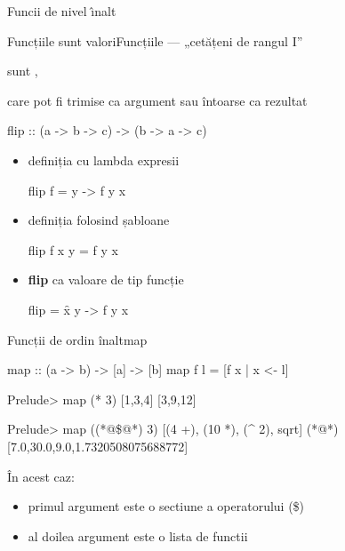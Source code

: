 \documentclass[xcolor=pdftex,romanian,colorlinks]{beamer}
\begin{document}
\begin{section}{Func\ts ii de nivel \^{\i}nalt}

\begin{frame}[fragile]{Funcțiile sunt valori}{Funcțiile --- „cetățeni de rangul I”}
\begin{block}{}  sunt ,

 care pot fi trimise  ca argument sau întoarse ca rezultat
 \end{block}



\begin{asciihs}
flip :: (a -> b -> c) -> (b -> a -> c)
\end{asciihs}\pause
\begin{itemize}
\item definiția cu lambda expresii
\begin{asciihs}
flip f = \x y -> f y x
\end{asciihs}
\item definiția folosind șabloane
\begin{asciihs}
flip f x y = f y x
\end{asciihs}
\item {\bf flip} ca valoare de tip funcție
\begin{asciihs}
flip = \f x y -> f y x
\end{asciihs}

\end{itemize}

\end{frame}

\begin{frame}[fragile]{Funcții de ordin înalt}{map}
\begin{asciihs}
map :: (a -> b) -> [a] -> [b]
map f l = [f x | x <- l]

Prelude> map (* 3) [1,3,4]
[3,9,12]
\end{asciihs}


\begin{asciihs}
Prelude> map ((*@\$@*) 3) [(4 +), (10 *), (^ 2), sqrt]
(*@\pause@*)[7.0,30.0,9.0,1.7320508075688772]
\end{asciihs}
\pause
\^{I}n acest caz:
\begin{itemize}
\item primul argument este o sectiune a operatorului (\$)
\item al doilea argument este o lista de functii
\medskip


\end{itemize}
\end{frame}
\end{section}
\end{document}
